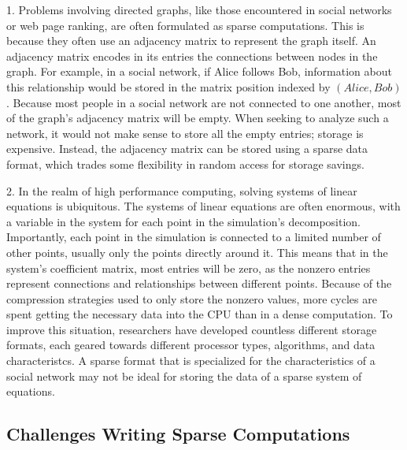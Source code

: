 1.
Problems involving directed graphs, like those encountered in social networks or web page ranking, are often formulated as sparse computations. 
This is because they often use an adjacency matrix to represent the graph itself.
An adjacency matrix encodes in its entries the connections between nodes in the graph. 
For example, in a social network, if Alice follows Bob, information about this relationship would be stored in the matrix position indexed by $(Alice,Bob)$. 
Because most people in a social network are not connected to one another, most of the graph's adjacency matrix will be empty.
When seeking to analyze such a network, it would not make sense to store all the empty entries; storage is expensive.
Instead, the adjacency matrix can be stored using a sparse data format, which trades some flexibility in random access for storage savings.

2. 
In the realm of high performance computing, solving systems of linear equations is ubiquitous.
The systems of linear equations are often enormous, with a variable in the system for each point in the simulation's decomposition.
Importantly, each point in the simulation is connected to a limited number of other points, usually only the points directly around it.
This means that in the system's coefficient matrix, most entries will be zero, as the nonzero entries represent connections and relationships between different points.
Because of the compression strategies used to only store the nonzero values, more cycles are spent getting the necessary data into the CPU than in a dense computation.
To improve this situation, researchers have developed countless different storage formats, each geared towards different processor types, algorithms, and data characteristcs.
A sparse format that is specialized for the characteristics of a social network may not be ideal for storing the data of a sparse system of equations.

\subsection{Challenges Writing Sparse Computations}

